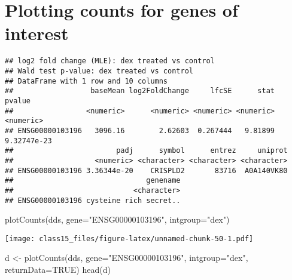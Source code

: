 \documentclass[
]{article}
\newenvironment{Shaded}{\begin{snugshade}}{\end{snugshade}}
\newcommand{\AttributeTok}[1]{\textcolor[rgb]{0.77,0.63,0.00}{#1}}
\newcommand{\ConstantTok}[1]{\textcolor[rgb]{0.00,0.00,0.00}{#1}}
\newcommand{\FunctionTok}[1]{\textcolor[rgb]{0.00,0.00,0.00}{#1}}
\newcommand{\NormalTok}[1]{#1}
\newcommand{\OtherTok}[1]{\textcolor[rgb]{0.56,0.35,0.01}{#1}}
\newcommand{\SpecialCharTok}[1]{\textcolor[rgb]{0.00,0.00,0.00}{#1}}
\newcommand{\StringTok}[1]{\textcolor[rgb]{0.31,0.60,0.02}{#1}}
\begin{document}
\hypertarget{plotting-counts-for-genes-of-interest}{%
\section{Plotting counts for genes of
interest}\label{plotting-counts-for-genes-of-interest}}

\begin{Shaded}
\end{Shaded}

\begin{verbatim}
## log2 fold change (MLE): dex treated vs control 
## Wald test p-value: dex treated vs control 
## DataFrame with 1 row and 10 columns
##                  baseMean log2FoldChange     lfcSE      stat      pvalue
##                 <numeric>      <numeric> <numeric> <numeric>   <numeric>
## ENSG00000103196   3096.16        2.62603  0.267444   9.81899 9.32747e-23
##                        padj      symbol      entrez     uniprot
##                   <numeric> <character> <character> <character>
## ENSG00000103196 3.36344e-20    CRISPLD2       83716  A0A140VK80
##                               genename
##                            <character>
## ENSG00000103196 cysteine rich secret..
\end{verbatim}

\begin{Shaded}
\begin{Highlighting}[]
\FunctionTok{plotCounts}\NormalTok{(dds, }\AttributeTok{gene=}\StringTok{"ENSG00000103196"}\NormalTok{, }\AttributeTok{intgroup=}\StringTok{"dex"}\NormalTok{)}
\end{Highlighting}
\end{Shaded}

\texttt{[image: class15\_files/figure-latex/unnamed-chunk-50-1.pdf]}

\begin{Shaded}
\begin{Highlighting}[]
\NormalTok{d }\OtherTok{\textless{}{-}} \FunctionTok{plotCounts}\NormalTok{(dds, }\AttributeTok{gene=}\StringTok{"ENSG00000103196"}\NormalTok{, }\AttributeTok{intgroup=}\StringTok{"dex"}\NormalTok{, }\AttributeTok{returnData=}\ConstantTok{TRUE}\NormalTok{)}
\FunctionTok{head}\NormalTok{(d)}
\end{Highlighting}
\end{Shaded}
\end{document}
